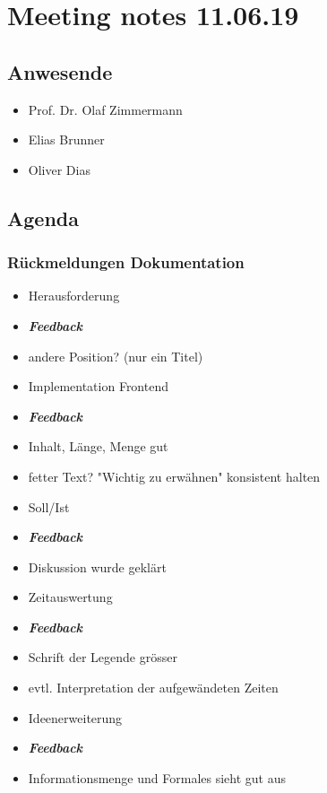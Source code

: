 \hypertarget{meeting-notes-110619}{%
\section*{Meeting notes 11.06.19}\label{meeting-notes-110619}}

\hypertarget{anwesende}{%
\subsection*{Anwesende}\label{anwesende}}

\begin{itemize}
\item
  Prof. Dr. Olaf Zimmermann
\item
  Elias Brunner
\item
  Oliver Dias
\end{itemize}

\hypertarget{agenda}{%
\subsection*{Agenda}\label{agenda}}

\hypertarget{ruxfcckmeldungen-dokumentation}{%
\subsubsection*{Rückmeldungen
Dokumentation}\label{ruxfcckmeldungen-dokumentation}}

\begin{itemize}
\item
  Herausforderung 
\item \emph{\textbf{Feedback}}
\item
  andere Position? (nur ein Titel)
\item
  Implementation Frontend 
\item \emph{\textbf{Feedback}}
\item
  Inhalt, Länge, Menge gut
\item
  fetter Text? "Wichtig zu erwähnen" konsistent halten
\item
  Soll/Ist 
\item \emph{\textbf{Feedback}}
\item
  Diskussion wurde geklärt
\item
  Zeitauswertung 
\item \emph{\textbf{Feedback}}
\item
  Schrift der Legende grösser
\item
  evtl. Interpretation der aufgewändeten Zeiten
\item
  Ideenerweiterung 
\item \emph{\textbf{Feedback}}
\item
  Informationsmenge und Formales sieht gut aus
\end{itemize}

